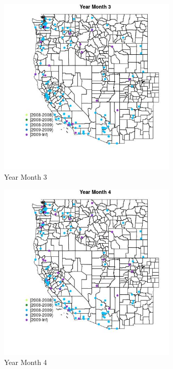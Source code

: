 \begin{figure} 
\centering  
\includegraphics[width=0.77\textwidth]{Code_Outputs/Report_ML_input_PM25_Step4_part_e_de_duplicated_aves_MapObsMo3Year.jpg} 
\caption{\label{fig:Report_ML_input_PM25_Step4_part_e_de_duplicated_avesMapObsMo3Year}Year Month 3} 
\end{figure} 
 

\begin{figure} 
\centering  
\includegraphics[width=0.77\textwidth]{Code_Outputs/Report_ML_input_PM25_Step4_part_e_de_duplicated_aves_MapObsMo4Year.jpg} 
\caption{\label{fig:Report_ML_input_PM25_Step4_part_e_de_duplicated_avesMapObsMo4Year}Year Month 4} 
\end{figure} 
 

